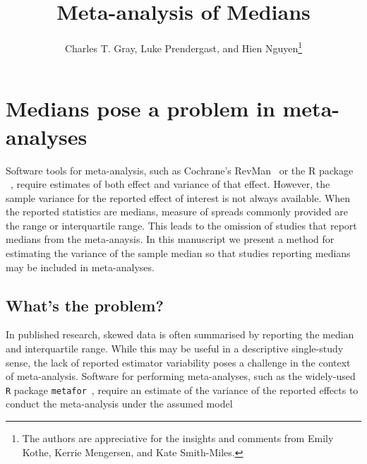 \documentclass{article}
\title{Meta-analysis of Medians}
\author{Charles T. Gray, Luke Prendergast, and Hien Nguyen\thanks{
The authors are appreciative for the insights and comments from Emily Kothe, Kerrie Mengersen, and Kate Smith-Miles.
}}
\begin{document}
\maketitle


\begin{abstract}
\end{abstract}


\section{Medians pose a problem in meta-analyses}

Software tools for meta-analysis, such as Cochrane's
RevMan~
or the R package ~\cite{viechtbauerConductingMetaanalysesMetafor2010},
require estimates of both effect and variance
of that effect. However, the sample variance for the reported effect of interest is not always available.
When the reported statistics are medians, measure of spreads commonly provided
are the range or interquartile range. This leads to the omission of studies that report medians from the meta-anaysis. In this manuscript we present a method for estimating the variance of the sample median so that studies reporting medians may be included in meta-analyses.



\subsection{What's the problem?}

In published research, skewed data is often summarised by reporting the median and interquartile range. While this may be useful in a descriptive single-study sense, the lack of reported estimator variability poses a challenge in the context of meta-analysis.  Software for performing meta-analyses, such as the widely-used \texttt{R} package \texttt{metafor}~\cite{viechtbauerConductingMetaanalysesMetafor2010}, require an estimate of the variance of the reported effects to conduct the meta-analysis under the assumed model
\end{document}

